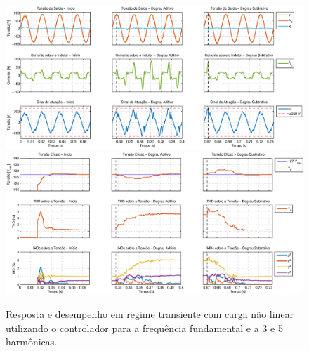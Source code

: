 \documentclass[repeatfields,oneside]{tcc}
\begin{document}
\begin{figure}[h]
    \centering
    \caption{Resposta e desempenho em regime transiente com carga não linear utilizando o controlador para a frequência fundamental e a 3{\textordfeminine} e 5{\textordfeminine} harmônicas.}
    \includegraphics[trim={80 50 1 20}, clip, width=\linewidth]{fig/closed_5.eps}
    \\\vspace{0.475cm}
    \includegraphics[trim={80 20 1 20}, clip, width=\linewidth]{fig/harm_5.eps}
\end{figure}
\end{document}
